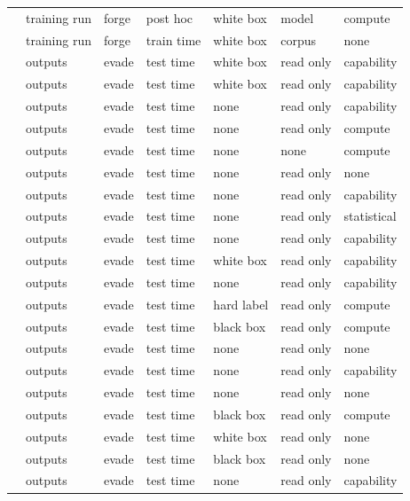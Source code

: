\begin{landscape}
\begin{longtable}{rllllll}
\cite{JYCDTCP21} & training run & forge & post hoc & white box & model & compute \\
\cite{SHKBL25} & training run & forge & train time & white box & corpus & none \\
\cite{TCBM20} & outputs & evade & test time & white box & read only & capability \\
\cite{CGBSHC22} & outputs & evade & test time & white box & read only & capability \\
\cite{SLDLN25} & outputs & evade & test time & none & read only & capability \\
\cite{BPR19} & outputs & evade & test time & none & read only & compute \\
\cite{BLPR18} & outputs & evade & test time & none & none & compute \\
\cite{GMFSRWG18} & outputs & evade & test time & none & read only & none \\
\cite{FFF18} & outputs & evade & test time & none & read only & capability \\
\cite{AH23} & outputs & evade & test time & none & read only & statistical \\
\cite{LAGHJ19} & outputs & evade & test time & none & read only & capability \\
\cite{CRK19} & outputs & evade & test time & white box & read only & capability \\
\cite{Mah19} & outputs & evade & test time & none & read only & capability \\
\cite{EMM20} & outputs & evade & test time & hard label & read only & compute \\
\cite{GJMM20} & outputs & evade & test time & black box & read only & compute \\
\cite{MDM19} & outputs & evade & test time & none & read only & none \\
\cite{PSV23} & outputs & evade & test time & none & read only & capability \\
\cite{MZME19} & outputs & evade & test time & none & read only & none \\
\cite{BGGKRR26} & outputs & evade & test time & black box & read only & compute \\
\cite{GCSGWVBHMB25} & outputs & evade & test time & white box & read only & none \\
\cite{FTHMLD26} & outputs & evade & test time & black box & read only & none \\
\cite{DMM20} & outputs & evade & test time & none & read only & capability \\

\end{longtable}
\end{landscape}
